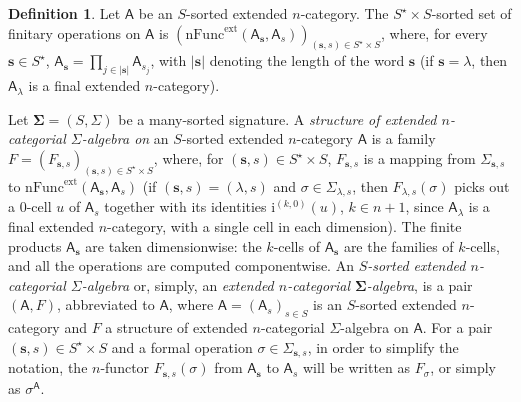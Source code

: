 \documentclass{amsart}
\newcommand{\bb}[1]{\ensuremath
	{\lvert #1 \rvert}}
\theoremstyle{plain}
\theoremstyle{definition}
\newtheorem{definition}[theorem]{Definition}
\begin{document}
\begin{definition}\label{DExtCatAlg}
Let $\mathsf{A}$ be an $S$-sorted extended $n$-category. The $S^{\star}\times S$-sorted set of finitary operations on $\mathsf{A}$ is $(\mathrm{nFunc}^{\mathrm{ext}}(\mathsf{A}_{\mathbf{s}},\mathsf{A}_{s}))_{(\mathbf{s},s)\in S^{\star}\times S}$, where, for every $\mathbf{s}\in S^{\star}$, $\mathsf{A}_{\mathbf{s}}=\prod_{j\in\bb{\mathbf{s}}}\mathsf{A}_{s_{j}}$, with $\bb{\mathbf{s}}$ denoting the length of the word $\mathbf{s}$ (if $\mathbf{s}=\lambda$, then $\mathsf{A}_{\lambda}$ is a final extended $n$-category). 

Let $\mathbf{\Sigma}=(S,\Sigma)$ be a many-sorted signature. 
A \emph{structure of extended $n$-categorial $\Sigma$-algebra on} an $S$-sorted extended $n$-category $\mathsf{A}$ is a family $F = (F_{\mathbf{s},s})_{(\mathbf{s},s)\in S^{\star}\times S}$, where, for $(\mathbf{s},s)\in S^{\star}\times S$, $F_{\mathbf{s},s}$ is a mapping from $\Sigma_{\mathbf{s},s}$ to $\mathrm{nFunc}^{\mathrm{ext}}(\mathsf{A}_{\mathbf{s}},\mathsf{A}_{s})$ (if $(\mathbf{s},s) = (\lambda,s)$ and $\sigma\in \Sigma_{\lambda,s}$, then $F_{\lambda,s}(\sigma)$ picks out a $0$-cell $u$ of $\mathsf{A}_{s}$ together with its identities $\mathrm{i}^{(k,0)}(u)$, $k\in n+1$, since $\mathsf{A}_{\lambda}$ is a final extended $n$-category, with a single cell in each dimension). The finite products $\mathsf{A}_{\mathbf{s}}$ are taken dimensionwise: the $k$-cells of $\mathsf{A}_{\mathbf{s}}$ are the families of $k$-cells, and all the operations are computed componentwise. An \emph{$S$-sorted extended $n$-categorial $\Sigma$-algebra} or, simply, an \emph{extended $n$-categorial $\mathbf{\Sigma}$-algebra}, is a pair $(\mathsf{A},F)$, abbreviated to $\boldsymbol{\mathsf{A}}$, where $\mathsf{A}=(\mathsf{A}_{s})_{s\in S}$ is an $S$-sorted extended $n$-category and $F$ a structure of extended $n$-categorial $\Sigma$-algebra on $\mathsf{A}$. For a pair $(\mathbf{s},s)\in S^{\star}\times S$ and a formal operation $\sigma\in \Sigma_{\mathbf{s},s}$, in order to simplify the notation, the $n$-functor $F_{\mathbf{s},s}(\sigma)$ from $\mathsf{A}_{\mathbf{s}}$ to $\mathsf{A}_{s}$ will be written as $F_{\sigma}$, or simply as $\sigma^{\boldsymbol{\mathsf{A}}}$. 


\end{definition}
\end{document}
